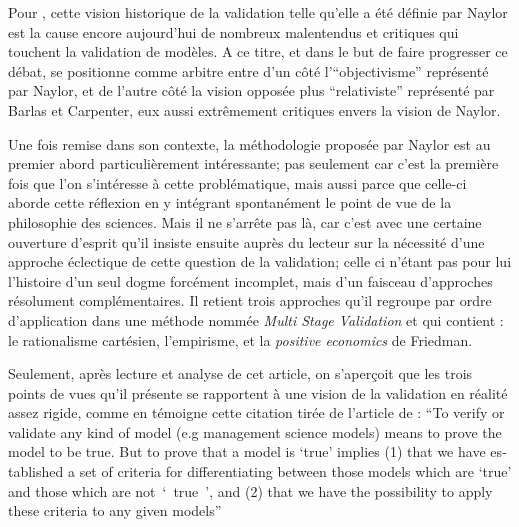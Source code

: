 Pour \textcite{Kleindorfer1998}, cette vision historique de la validation telle qu'elle a été définie par Naylor est la cause encore aujourd'hui de nombreux malentendus et critiques qui touchent la validation de modèles. A ce titre, et dans le but de faire progresser ce débat, \textcite{Kleindorfer1998} se positionne comme arbitre entre d'un côté l'\enquote{objectivisme} représenté par Naylor, et de l'autre côté la vision opposée plus \enquote{relativiste} représenté par Barlas et Carpenter, eux aussi extrêmement critiques envers la vision de Naylor.

Une fois remise dans son contexte, la méthodologie proposée par Naylor est au premier abord particulièrement intéressante; pas seulement car c'est la première fois que l'on s'intéresse à cette problématique, mais aussi parce que celle-ci aborde cette réflexion en y intégrant spontanément le point de vue de la philosophie des sciences. Mais il ne s'arrête pas là, car c'est avec une certaine ouverture d'esprit qu'il insiste ensuite auprès du lecteur sur la nécessité d'une approche éclectique de cette question de la validation; celle ci n'étant pas pour lui l'histoire d'un seul dogme forcément incomplet, mais d'un faisceau d'approches résolument complémentaires. Il retient trois approches qu'il regroupe par ordre d'application dans une méthode nommée \textit{Multi Stage Validation} et qui contient : le rationalisme cartésien, l'empirisme, et la \textit{positive economics} de Friedman.

Seulement, après lecture et analyse de cet article, on s'aperçoit que les trois points de vues qu'il présente se rapportent à une vision de la validation en réalité assez rigide, comme en témoigne cette citation tirée de l'article de \textcite{Naylor1967} : \foreignquote{english}{To verify or validate any kind of model (e.g management science models) means to prove the model to be true. But to prove that a model is \enquote{true} implies (1) that we have established a set of criteria for differentiating between those models which are \enquote{true} and those which are not \enquote{ true }, and (2) that we have the possibility to apply these criteria to any given models}

